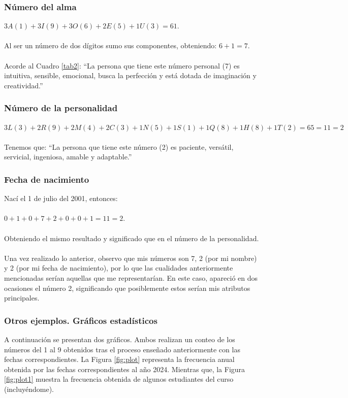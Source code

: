 \documentclass{article}
\begin{document}
	\subsubsection*{Número del alma}
	$3A(1)+3I(9)+3O(6)+2E(5)+1U(3)=61$.\\\\
	Al ser un número de dos dígitos sumo sus componentes, obteniendo: $6+1=7$.\\\\
	Acorde al Cuadro \ref{tab2}: “La persona que tiene este número personal (7) es intuitiva, sensible, emocional, busca la perfección y está dotada de imaginación y creatividad.”
	
	\subsubsection*{Número de la personalidad}
	$3L(3)+2R(9)+2M(4)+2C(3)+1N(5)+1S(1)+1Q(8)+1H(8)+1T(2)=65=11=2$\\\\
	Tenemos que: “La persona que tiene este número (2) es paciente, versátil, servicial, ingeniosa, amable y adaptable.”
	
	\subsubsection*{Fecha de nacimiento}
	Nací el 1 de julio del 2001, entonces:\\\\
	$0+1+0+7+2+0+0+1=11=2$.\\\\
	Obteniendo el mismo resultado y significado que en el número de la personalidad.\\\\
	Una vez realizado lo anterior, observo que mis números son 7, 2 (por mi nombre) y 2 (por mi fecha de nacimiento), por lo que las cualidades anteriormente mencionadas serían aquellas que me representarían. En este caso, apareció en dos ocasiones el número 2, significando que posiblemente estos serían mis atributos principales.
	
	\subsubsection*{Otros ejemplos. Gráficos estadísticos}
	
	A continuación se presentan dos gráficos. Ambos realizan un conteo de los números del 1 al 9 obtenidos tras el proceso enseñado anteriormente con las fechas correspondientes. La Figura \ref{fig:plot} representa la frecuencia anual obtenida por las fechas correspondientes al año 2024. Mientras que, la Figura \ref{fig:plot1} muestra la frecuencia obtenida de algunos estudiantes del curso (incluyéndome).
	
\end{document}
